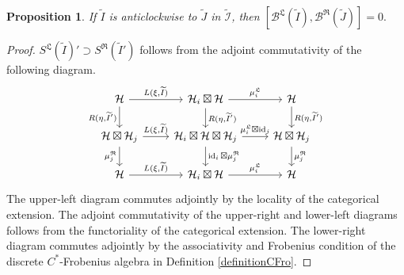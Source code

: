 \documentclass{article}
\newtheorem{proposition}{Proposition}
\newcommand{\hilb}{\mathcal{H}}
\newcommand{\B}{\mathcal{B}}
\begin{document}
\begin{proposition}{\label{commutant}}
If $\widetilde{I}$ is anticlockwise to $\widetilde{J}$ in $\widetilde{\mathcal{I}}$, then
$[\B^{\mathfrak{L}}(\widetilde{I}), \B^{\mathfrak{R}}(\widetilde{J})]= 0.$
\end{proposition}
\begin{proof}
   $S^{\mathfrak{L}}(\widetilde{I})' \supset S^{\mathfrak{R}}(\widetilde{I}')$ follows from the adjoint commutativity of the following diagram.
    \[
    \begin{tikzcd}
        \hilb \arrow{r}{L(\xi,\widetilde{I})}  \arrow[swap]{d}{R(\eta,\widetilde{I}')}      &\hilb_i\boxtimes\hilb \arrow{r}{\mu_i^{\mathfrak{L}}} \arrow{d}{R(\eta,\widetilde{I}')} &\hilb \arrow{d}{R(\eta,\widetilde{I}')}\\
        \hilb\boxtimes\hilb_j \arrow{r}{L(\xi,\widetilde{I})} \arrow[swap]{d}{\mu_j^{\mathfrak{R}}}     &\hilb_i\boxtimes\hilb\boxtimes\hilb_j     \arrow{r}{\mu_i^{\mathfrak{L}}\boxtimes\operatorname{id}_j} \arrow{d}{\operatorname{id}_i\boxtimes\mu_j^{\mathfrak{R}}}             &\hilb\boxtimes\hilb_j\arrow{d}{\mu_j^{\mathfrak{R}}} \\
        \hilb  \arrow{r}{L(\xi,\widetilde{I})}                     &\hilb_i\boxtimes\hilb \arrow{r}{\mu_i^{\mathfrak{L}}}   &\hilb 
    \end{tikzcd}
    \]
    The upper-left diagram commutes adjointly by the locality of the categorical extension. The adjoint commutativity of the upper-right and lower-left diagrams follows from the functoriality of the categorical extension. The lower-right diagram commutes adjointly by the associativity and Frobenius condition of the discrete $C^*$-Frobenius algebra in Definition \ref{definitionCFro}.
    
    
\end{proof}
\end{document}
